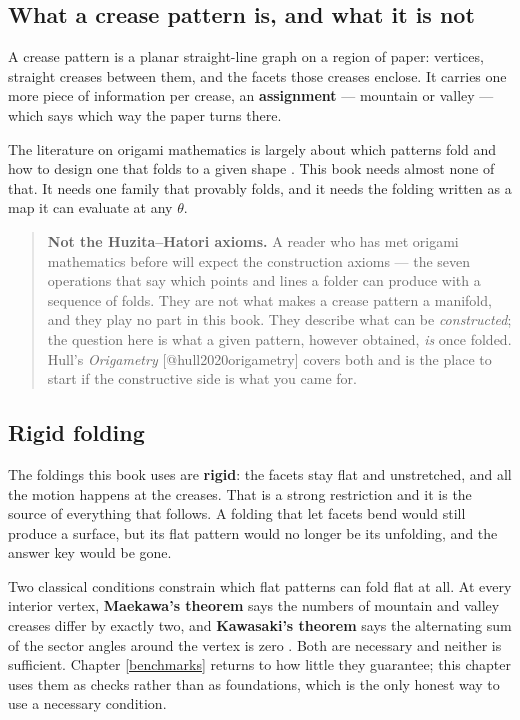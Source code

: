 \documentclass[
  british,
  a4paper,
]{book}
\newcounter{none} %
\newenvironment{boxinfo}{\begin{quote}}{\end{quote}}
\begin{document}
\subsection{What a crease pattern is, and what it is not}\label{what-a-crease-pattern-is-and-what-it-is-not}

A crease pattern is a planar straight-line graph on a region of paper: vertices,
straight creases between them, and the facets those creases enclose. It carries
one more piece of information per crease, an \textbf{assignment} --- mountain or valley
--- which says which way the paper turns there.

The literature on origami mathematics is largely about which patterns fold and
how to design one that folds to a given shape \citep{lang2011origami, demaine2007folding}. This book needs almost none of that. It needs one family
that provably folds, and it needs the folding written as a map it can evaluate
at any \(\theta\).

\begin{boxinfo}
\textbf{Not the Huzita--Hatori axioms.} A reader who has met origami
mathematics before will expect the construction axioms --- the seven
operations that say which points and lines a folder can produce with a
sequence of folds. They are not what makes a crease pattern a manifold,
and they play no part in this book. They describe what can be
\emph{constructed}; the question here is what a given pattern, however
obtained, \emph{is} once folded. Hull's \emph{Origametry}
{[}@hull2020origametry{]} covers both and is the place to start if the
constructive side is what you came for.
\end{boxinfo}

\subsection{Rigid folding}\label{rigid-folding}

The foldings this book uses are \textbf{rigid}: the facets stay flat and unstretched,
and all the motion happens at the creases. That is a strong restriction and it
is the source of everything that follows. A folding that let facets bend would
still produce a surface, but its flat pattern would no longer be its unfolding,
and the answer key would be gone.

Two classical conditions constrain which flat patterns can fold flat at all. At
every interior vertex, \textbf{Maekawa's theorem} says the numbers of mountain and
valley creases differ by exactly two, and \textbf{Kawasaki's theorem} says the
alternating sum of the sector angles around the vertex is zero
\citep{hull2020origametry}. Both are necessary and neither is sufficient. Chapter
\ref{benchmarks} returns to how little they guarantee; this chapter uses them
as checks rather than as foundations, which is the only honest way to use a
necessary condition.
\end{document}

